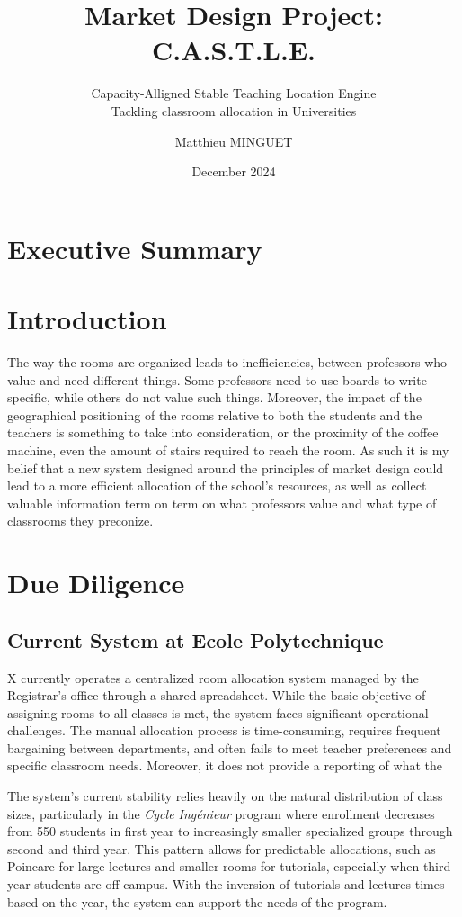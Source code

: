 \documentclass[a4paper, oneside]{article}
\title[\castle{}]{Market Design Project: C.A.S.T.L.E.}
\subtitle{Capacity-Alligned Stable Teaching Location Engine\\
Tackling classroom allocation in Universities}
\author{Matthieu MINGUET}
\date{December 2024}
\theoremstyle{plain}
\begin{document}
\maketitle

\section*{Executive Summary}
\pagebreak

\tableofcontents
\pagebreak

\section*{Introduction}
The way the rooms are organized leads to inefficiencies, between professors who value and need different things. Some professors need to use boards to write specific, while others do not value such things. Moreover, the impact of the geographical positioning of the rooms relative to both the students and the teachers is something to take into consideration, or the proximity of the coffee machine, even the amount of stairs required to reach the room.
As such it is my belief that a new system designed around the principles of market design could lead to a more efficient allocation of the school’s resources, as well as collect valuable information term on term on what professors value and what type of classrooms they preconize.
\pagebreak

\section{Due Diligence}
\subsection{Current System at Ecole Polytechnique}
X currently operates a centralized room allocation system managed by the Registrar's office through a shared spreadsheet.
While the basic objective of assigning rooms to all classes is met, the system faces significant operational challenges.
The manual allocation process is time-consuming, requires frequent bargaining between departments, and often fails to meet teacher preferences and specific classroom needs.
Moreover, it does not provide a reporting of what the

The system's current stability relies heavily on the natural distribution of class sizes, particularly in the \textit{Cycle Ingénieur} program where enrollment decreases
from 550 students in first year to increasingly smaller specialized groups through second and third year. This pattern allows for predictable allocations, such as Poincare for large
lectures and smaller rooms for tutorials, especially when third-year students are off-campus. With the inversion of tutorials and lectures times based on the year, the system can support
the needs of the program.
\end{document}
